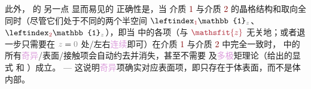 此外， 的 另一点 显而易见的 正确性是，当 介质 \textcolor{Maroon}{1} 与介质 \textcolor{Maroon}{2} 的晶格结构和取向全同时（尽管它们处于不同的两个半空间 $\leftindex_{\textcolor{Maroon}{1}} {\mathbb{1}}_{\mathcolor{gray}{z}}$、$\leftindex_{\textcolor{Maroon}{2}} {\mathbb{1}}_{\mathcolor{gray}{z}}$），即当  中的各项（与 $\textcolor{Maroon}{\mathsfit{z}}$ 无关地；或者退一步只需要在 $\mathcolor{gray}{z \mathcolor{black}{=} 0}$ 处/左右\textcolor{Plum}{连续}即可）在介质 \textcolor{Maroon}{1} 与介质 \textcolor{Maroon}{2} 中完全一致时， 中的所有\textcolor{Plum}{奇异}/表面/接触项会自动约去并消失，甚至不需要  及\textcolor{Plum}{多极}矩理论（给出的显式  和 ）成立。 ---  这说明\textcolor{Plum}{奇异}项确实对应表面项，即只存在于体表面，而不是体内部。

